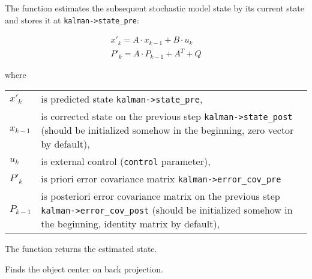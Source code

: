 \begin{description}
\ifC
{}
\else
{}
\fi
{}
\end{description}

The function estimates the subsequent stochastic model state by its current state and stores it at \texttt{kalman->state\_pre}:

\[
\begin{array}{l}
x'_k=A \cdot x_{k-1}+B \cdot u_k\\
P'_k=A \cdot P_{k-1}+A^T + Q
\end{array}
\]

where

\begin{tabular}{l p{5 in}}
\hline
$x'_k$ & is predicted state \texttt{kalman->state\_pre},\\
$x_{k-1}$ & is corrected state on the previous step \texttt{kalman->state\_post}
                (should be initialized somehow in the beginning, zero vector by default),\\
$u_k$ & is external control (\texttt{control} parameter),\\
$P'_k$ & is priori error covariance matrix \texttt{kalman->error\_cov\_pre}\\
$P_{k-1}$ & is posteriori error covariance matrix on the previous step \texttt{kalman->error\_cov\_post}
                (should be initialized somehow in the beginning, identity matrix by default),
\end{tabular}

The function returns the estimated state.

Finds the object center on back projection.


\begin{description}
\end{description}

